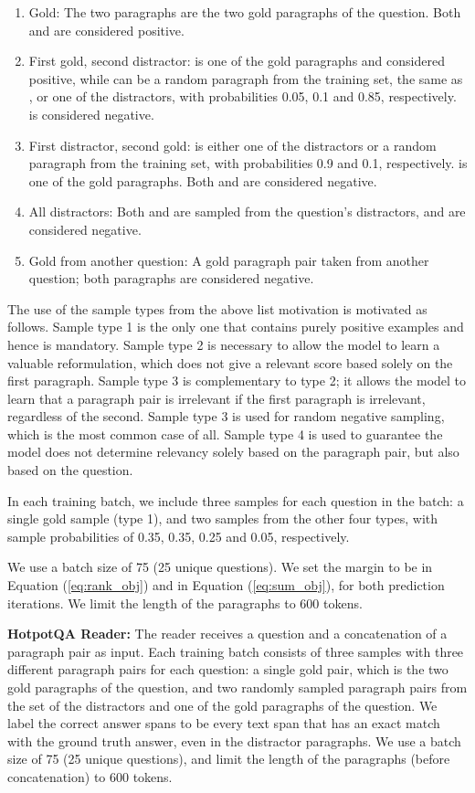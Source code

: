 \documentclass[11pt,a4paper,dvipsnames]{article}
\begin{document}
\begin{enumerate}
    \item Gold: The two paragraphs are the two gold paragraphs of the question. Both  and  are considered positive.
    \item First gold, second distractor:  is one of the gold paragraphs and considered positive, while  can be a random paragraph from the training set, the same as , or one of the distractors, with probabilities 0.05, 0.1 and 0.85, respectively.
     is considered negative.
    \item First distractor, second gold:  is either one of the distractors or a random paragraph from the training set, with probabilities 0.9 and 0.1, respectively.  is one of the gold paragraphs. Both  and  are considered negative.
    \item All distractors: Both  and  are sampled from the question's distractors, and are considered negative.
    \item Gold from another question: A gold paragraph pair taken from another question; both paragraphs are considered negative.
\end{enumerate}
The use of the sample types from the above list motivation is motivated as follows. Sample type 1 is the only one that contains purely positive examples and hence is mandatory. Sample type 2 is necessary to allow the model to learn a valuable reformulation, which does not give a relevant score based solely on the first paragraph. Sample type 3 is complementary to type 2; it allows the model to learn that a paragraph pair is irrelevant if the first paragraph is irrelevant, regardless of the second. Sample type 3 is used for random negative sampling, which is the most common case of all. Sample type 4 is used to guarantee the model does not determine relevancy solely based on the paragraph pair, but also based on the question. \par
In each training batch, we include three samples for each question in the batch: a single gold sample (type 1), and two samples from the other four types, with sample probabilities of 0.35, 0.35, 0.25 and 0.05, respectively. 
\par 
We use a batch size of 75 (25 unique questions). We set the margin to be  in Equation (\ref{eq:rank_obj}) and  in Equation (\ref{eq:sum_obj}), for both prediction iterations. We limit the length of the paragraphs to 600 tokens. \par
\textbf{HotpotQA Reader:} The reader receives a question and a concatenation of a paragraph pair as input. Each training batch consists of three samples with three different paragraph pairs for each question: a single gold pair, which is the two gold paragraphs of the question, and two randomly sampled paragraph pairs from the set of the distractors and one of the gold paragraphs of the question. We label the correct answer spans to be every text span that has an exact match with the ground truth answer, even in the distractor paragraphs. We use a batch size of 75 (25 unique questions), and limit the length of the paragraphs (before concatenation) to 600 tokens.
\end{document}
